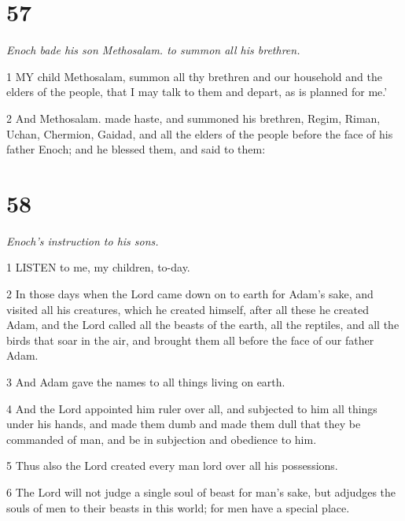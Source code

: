 \chapter{57}

\par \textit{Enoch bade his son Methosalam. to summon all his brethren.}

\par 1 MY child Methosalam, summon all thy brethren and our household and the elders of the people, that I may talk to them and depart, as is planned for me.'

\par 2 And Methosalam. made haste, and summoned his brethren, Regim, Riman, Uchan, Chermion, Gaidad, and all the elders of the people before the face of his father Enoch; and he blessed them, and said to them:

\chapter{58}

\par \textit{Enoch's instruction to his sons.}

\par 1 LISTEN to me, my children, to-day.

\par 2 In those days when the Lord came down on to earth for Adam's sake, and visited all his creatures, which he created himself, after all these he created Adam, and the Lord called all the beasts of the earth, all the reptiles, and all the birds that soar in the air, and brought them all before the face of our father Adam.

\par 3 And Adam gave the names to all things living on earth.

\par 4 And the Lord appointed him ruler over all, and subjected to him all things under his hands, and made them dumb and made them dull that they be commanded of man, and be in subjection and obedience to him.

\par 5 Thus also the Lord created every man lord over all his possessions.

\par 6 The Lord will not judge a single soul of beast for man's sake, but adjudges the souls of men to their beasts in this world; for men have a special place.

